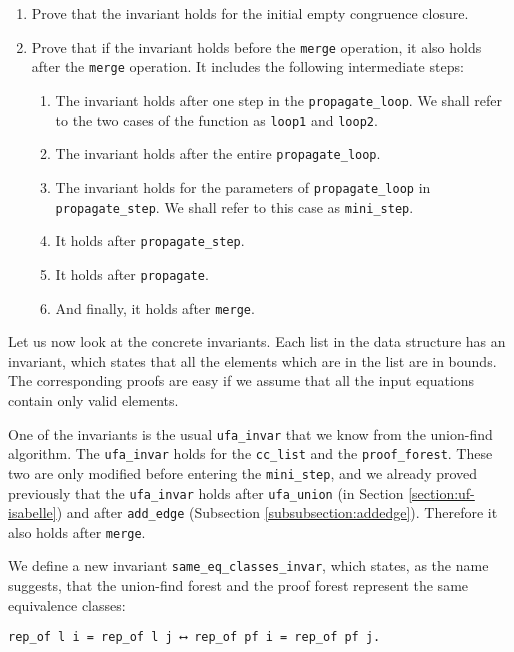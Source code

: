 \begin{enumerate}
	\item Prove that the invariant holds for the initial empty congruence closure.

	\item Prove that if the invariant holds before the \lstinline|merge| operation, it also holds after the \lstinline|merge| operation. It includes the following intermediate steps:
    \begin{enumerate}
        \item The invariant holds after one step in the \lstinline{propagate_loop}. We shall refer to the two cases of the function as \lstinline{loop1} and \lstinline{loop2}.
    	\item The invariant holds after the entire \lstinline{propagate_loop}.
    	\item The invariant holds for the parameters of \lstinline{propagate_loop} in \lstinline{propagate_step}. We shall refer to this case as \lstinline{mini_step}.
    	\item It holds after \lstinline{propagate_step}.
    	\item It holds after \lstinline{propagate}.
    	\item And finally, it holds after \lstinline{merge}.
    \end{enumerate}
\end{enumerate}

Let us now look at the concrete invariants. Each list in the data structure has an invariant, which states that all the elements which are in the list are in bounds. The corresponding proofs are easy if we assume that all the input equations contain only valid elements.

One of the invariants is the usual \lstinline{ufa_invar} that we know from the union-find algorithm. The \lstinline{ufa_invar} holds for the \lstinline{cc_list} and the \lstinline{proof_forest}. These two are only modified before entering the \lstinline{mini_step}, and we already proved previously that the \lstinline{ufa_invar} holds after \lstinline{ufa_union} (in Section \ref{section:uf-isabelle}) and after \lstinline{add_edge} (Subsection \ref{subsubsection:addedge}). Therefore it also holds after \lstinline{merge}.

We define a new invariant \lstinline{same_eq_classes_invar}, which states, as the name suggests, that the union-find forest and the proof forest represent the same equivalence classes:

\begin{lstlisting}
rep_of l i = rep_of l j ⟷ rep_of pf i = rep_of pf j.
\end{lstlisting}

